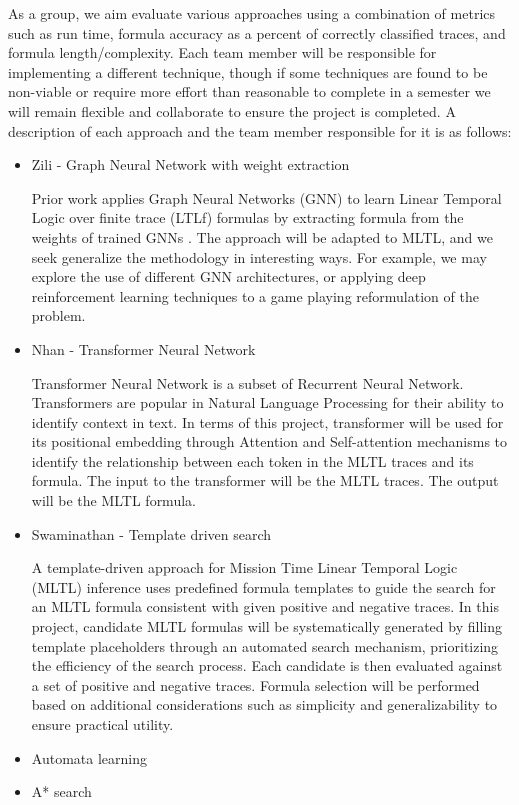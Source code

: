 \documentclass[12pt]{article}
\begin{document}
As a group, we aim evaluate various approaches using a combination of metrics such as run time, formula accuracy as a percent of correctly classified traces, and formula length/complexity.  
Each team member will be responsible for implementing a different technique, though if some techniques are found to be non-viable or require more effort than reasonable to complete in a semester we will remain flexible and collaborate to ensure the project is completed.
A description of each approach and the team member responsible for it is as follows:
\begin{itemize}
  \item Zili - Graph Neural Network with weight extraction
  
  Prior work applies Graph Neural Networks (GNN) to learn Linear Temporal Logic over finite trace (LTLf) formulas by extracting formula from the weights of trained GNNs \cite{Luo_Liang_Du_Wan_Peng_Zhang_2022}.
  The approach will be adapted to MLTL, and we seek generalize the methodology in interesting ways. 
  For example, we may explore the use of different GNN architectures, or applying deep reinforcement learning techniques to a game playing reformulation of the problem. 

  \item Nhan - Transformer Neural Network
	
	Transformer Neural Network is a subset of Recurrent Neural Network. Transformers are popular in Natural Language Processing for their ability to identify context in text. In terms of this project, transformer will be used for its positional embedding through Attention and Self-attention mechanisms to identify the relationship between each token in the MLTL traces and its formula. The input to the transformer will be the MLTL traces. The output will be the MLTL formula.
    
	\item Swaminathan - Template driven search
	
  A template-driven approach for Mission Time Linear Temporal Logic (MLTL) inference uses predefined formula templates to guide the search for an MLTL formula consistent with given positive and negative traces. In this project, candidate MLTL formulas will be systematically generated by filling template placeholders through an automated search mechanism, prioritizing the efficiency of the search process. Each candidate is then evaluated against a set of positive and negative traces. Formula selection will be performed based on additional considerations such as simplicity and generalizability to ensure practical utility.

    \item Automata learning
    \item A* search
\end{itemize} 

\newpage
\end{document}
